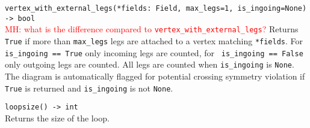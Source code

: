 \begin{basedescript}{\desclabelstyle{\pushlabel}}
   \item[\hspace{-1em}]\colorbox{gray!30}{\lstinline[style=pykw]{vertex_with_external_legs(*fields: Field, max_legs=1, is_ingoing=None) -> bool}} \vspace{0.1cm}\\
   \textcolor{red}{MH: what is the difference compared to \lstinline{vertex_with_external_legs}?}
   Returns \texttt{True} if more than \texttt{max\_legs} legs are attached to a vertex matching \texttt{*fields}. For \lstinline[style=pykw]| is_ingoing == True| only incoming legs are counted, for \lstinline[style=pykw]| is_ingoing == False| only outgoing legs are counted. All legs are counted when \texttt{is\_ingoing} is \texttt{None}. The diagram is automatically flagged for potential crossing symmetry violation if \texttt{True} is returned and \texttt{is\_ingoing} is not \texttt{None}.

   \item[\hspace{-1em}]\colorbox{gray!30}{\lstinline[style=pykw]|loopsize() -> int|} \vspace{0.1cm}\\
   Returns the size of the loop.
\end{basedescript}
